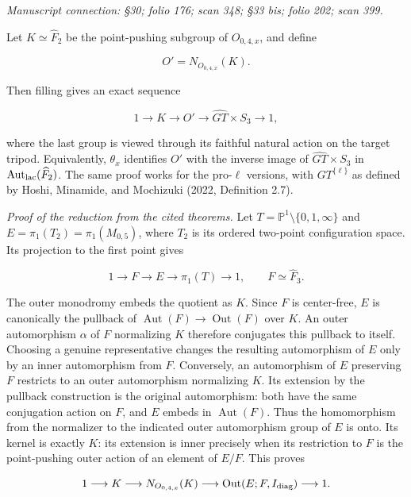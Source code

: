 \documentclass[10pt,a4paper]{article}
\begin{document}
\emph{Manuscript connection: \S{}30; folio 176; scan 348; \S{}33 bis; folio 202; scan 399.}

\nopagebreak[4]

Let \(K\simeq\widehat F_2\) be the point-pushing subgroup of \(O_{0,4,x}\), and define

\[
 O'=N_{O_{0,4,x}}(K).
\]

Then filling gives an exact sequence

\[
 1\longrightarrow K\longrightarrow O'
 \longrightarrow\widehat{GT}\times S_3\longrightarrow1,
\]

where the last group is viewed through its faithful natural action on the target tripod. Equivalently, \(\theta_x\) identifies \(O'\) with the inverse image of \(\widehat{GT}\times S_3\) in \(\operatorname{Aut}_{\rm lac}(\widehat F_2)\). The same proof works for the pro-\(\ell\) versions, with \(GT^{\{\ell\}}\) as defined by Hoshi, Minamide, and Mochizuki (2022, Definition 2.7).

\emph{Proof of the reduction from the cited theorems.} Let \(T=\mathbb P^1\setminus\{0,1,\infty\}\) and \(E=\pi_1(T_2)=\pi_1(M_{0,5})\), where \(T_2\) is its ordered two-point configuration space. Its projection to the first point gives

\[
 1\longrightarrow F\longrightarrow E\longrightarrow\pi_1(T)\longrightarrow1,
 \qquad F\simeq\widehat F_3.
\]

The outer monodromy embeds the quotient as \(K\). Since \(F\) is center-free, \(E\) is canonically the pullback of \(\operatorname{Aut}(F)\to\operatorname{Out}(F)\) over \(K\). An outer automorphism \(\alpha\) of \(F\) normalizing \(K\) therefore conjugates this pullback to itself. Choosing a genuine representative changes the resulting automorphism of \(E\) only by an inner automorphism from \(F\). Conversely, an automorphism of \(E\) preserving \(F\) restricts to an outer automorphism normalizing \(K\). Its extension by the pullback construction is the original automorphism: both have the same conjugation action on \(F\), and \(E\) embeds in \(\operatorname{Aut}(F)\). Thus the homomorphism from the normalizer to the indicated outer automorphism group of \(E\) is onto. Its kernel is exactly \(K\): its extension is inner precisely when its restriction to \(F\) is the point-pushing outer action of an element of \(E/F\). This proves

\[
 1\longrightarrow K\longrightarrow N_{O_{0,4,x}}(K)
 \longrightarrow\operatorname{Out}(E;F,I_{\rm diag})\longrightarrow1.
\]
\end{document}
